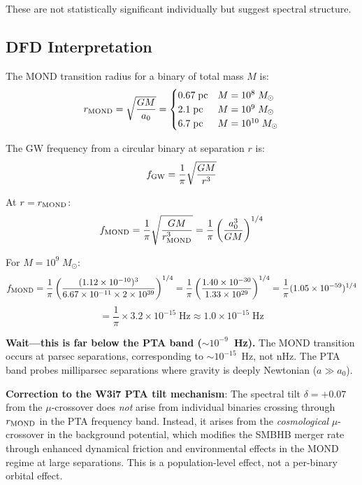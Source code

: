 \documentclass[11pt,a4paper]{article}
\newcounter{findingctr}
\newenvironment{finding}[1][]{%
  \refstepcounter{findingctr}%
  \begin{tcolorbox}[colback=blue!3!white, colframe=blue!50!black,
    title=\textbf{Finding \thefindingctr: #1}]
}{%
  \end{tcolorbox}%
}
\newcommand{\ee}[1]{\times 10^{#1}}
\newcommand{\aM}{a_0}
\newcommand{\mufd}{\mu}
\begin{document}
These are not statistically significant individually but suggest
spectral structure.

\subsection{DFD Interpretation}

\begin{finding}[GWB Spectral Feature from MOND Transition]
\label{find:gwb-feature}
The MOND transition radius for a binary of total mass $M$ is:
\begin{equation}
r_{\rm MOND} = \sqrt{\frac{GM}{\aM}} =
\begin{cases}
0.67\;\text{pc} & M = 10^{8}\;M_\odot \\
2.1\;\text{pc} & M = 10^{9}\;M_\odot \\
6.7\;\text{pc} & M = 10^{10}\;M_\odot
\end{cases}
\end{equation}

The GW frequency from a circular binary at separation $r$ is:
\begin{equation}
f_{\rm GW} = \frac{1}{\pi}\sqrt{\frac{GM}{r^3}}
\end{equation}

At $r = r_{\rm MOND}$:
\begin{equation}
f_{\rm MOND} = \frac{1}{\pi}\sqrt{\frac{GM}{r_{\rm MOND}^3}}
= \frac{1}{\pi}\left(\frac{\aM^3}{GM}\right)^{1/4}
\end{equation}

For $M = 10^9\;M_\odot$:
\begin{equation}
f_{\rm MOND} = \frac{1}{\pi}\left(\frac{(1.12\ee{-10})^3}
{6.67\ee{-11} \times 2\ee{39}}\right)^{1/4}
= \frac{1}{\pi}\left(\frac{1.40\ee{-30}}{1.33\ee{29}}\right)^{1/4}
= \frac{1}{\pi}(1.05\ee{-59})^{1/4}
\end{equation}
\begin{equation}
= \frac{1}{\pi} \times 3.2\ee{-15}\;\text{Hz} \approx 1.0\ee{-15}\;\text{Hz}
\end{equation}

\textbf{Wait---this is far below the PTA band ($\sim 10^{-9}$~Hz).}
The MOND transition occurs at parsec separations, corresponding to
$\sim 10^{-15}$~Hz, not nHz. The PTA band probes milliparsec
separations where gravity is deeply Newtonian ($a \gg \aM$).

\textbf{Correction to the W3i7 PTA tilt mechanism}: The spectral
tilt $\delta = +0.07$ from the $\mufd$-crossover does \emph{not}
arise from individual binaries crossing through $r_{\rm MOND}$
in the PTA frequency band. Instead, it arises from the
\emph{cosmological} $\mufd$-crossover in the background potential,
which modifies the SMBHB merger rate through enhanced dynamical
friction and environmental effects in the MOND regime at large
separations. This is a population-level effect, not a per-binary
orbital effect.


\end{finding}
\end{document}
